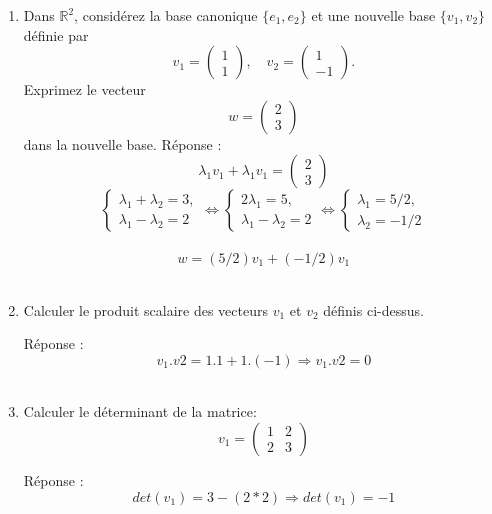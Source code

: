 \documentclass[a4paper,12pt]{article}
\begin{document}
\begin{enumerate}
    \item Dans \(\mathbb{R}^2\), considérez la base canonique \(\{e_1, e_2\}\) et une nouvelle base \(\{v_1, v_2\}\) définie par
\[
v_1 = \begin{pmatrix} 1 \\ 1 \end{pmatrix}, \quad
v_2 = \begin{pmatrix} 1 \\ -1 \end{pmatrix}.
\]
Exprimez le vecteur 
\[
w = \begin{pmatrix} 2 \\ 3 \end{pmatrix}
\]
dans la nouvelle base.
Réponse :
\[
\lambda_1 v_1 + \lambda_1 v_1 = \begin{pmatrix} 2 \\ 3 \end{pmatrix}
\]
\[
\begin{cases}
\lambda_1 + \lambda_2 = 3,\\[1mm]
\lambda_1 - \lambda_2 = 2 
\end{cases}
\Leftrightarrow 
\begin{cases}
2 \lambda_1 = 5,\\[1mm]
\lambda_1 - \lambda_2 = 2  
\end{cases}
\Leftrightarrow 
\begin{cases}
\lambda_1 = 5/2,\\[1mm]
\lambda_2 = -1/2 
\end{cases}
\]\\
\[
\boxed{
 w = (5/2) v_1 + (-1/2) v_1
}
\]\\


    \item Calculer le produit scalaire des vecteurs $v_1$ et $v_2$ définis ci-dessus.

Réponse :
\[
v_1 . v2 = 1 . 1 + 1 . (-1) \Rightarrow
\boxed{v_1 . v2 = 0}
\]\\


    \item Calculer le déterminant de la matrice:
\[
v_1 = 
    \begin{pmatrix} 
        1 & 2 \\ 
        2 & 3 
    \end{pmatrix}
\]

Réponse :
\[
det(v_1) = 3 - (2 * 2) \Rightarrow
\boxed{det(v_1) = -1}
\]
\end{enumerate}
\end{document}
